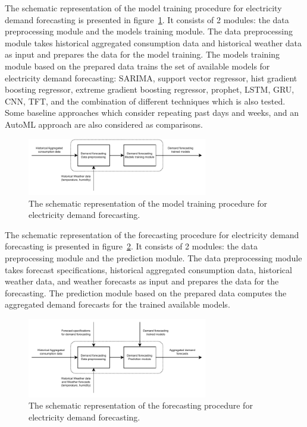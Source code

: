 The schematic representation of the model training procedure for electricity demand forecasting is presented in figure~\ref{fig:modeltrainingdemand}.
It consists of 2 modules: the data preprocessing module and the models training module.
The data preprocessing module takes historical aggregated consumption data and historical weather data as input and prepares the data for the model training.
The models training module based on the prepared data trains the set of available models for electricity demand forecasting: SARIMA, support vector regressor, hist gradient boosting regressor, extreme gradient boosting regressor, prophet, LSTM, GRU, CNN, TFT, and the combination of different techniques which is also tested.
Some baseline approaches which consider repeating past days and weeks, and an AutoML approach are also considered as comparisons.

\begin{figure}[H]
\centering
\includegraphics[width=0.7\textwidth]{images/system_model_training_demand}
\caption{The schematic representation of the model training procedure for electricity demand forecasting.}
\label{fig:modeltrainingdemand}
\end{figure}

The schematic representation of the forecasting procedure for electricity demand forecasting is presented in figure~\ref{fig:modelforecastingdemand}.
It consists of 2 modules: the data preprocessing module and the prediction module.
The data preprocessing module takes forecast specifications, historical aggregated consumption data, historical weather data, and weather forecasts as input and prepares the data for the forecasting.
The prediction module based on the prepared data computes the aggregated demand forecasts for the trained available models.

\begin{figure}[H]
\centering
\includegraphics[width=0.7\textwidth]{images/system_model_forecasting_demand}
\caption{The schematic representation of the forecasting procedure for electricity demand forecasting.}
\label{fig:modelforecastingdemand}
\end{figure}


